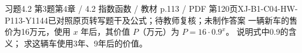 \par\noindent\begin{minipage}{\linewidth}
\begin{bankitem}{习题4.2 第3题}{第4章 / 4.2 指数函数 / 教材 p.113 / PDF 第120页}{XJ-B1-C04-HW-P113-Y1144}{已对照原页转写题干及公式；待教师复核；未制作答案}
一辆新车的售价为16万元，使用 $x$ 年后，其价值 $P$（万元）为 $P=16\cdot0.9^x$。
说明式中0.9的含义；
求这辆车使用3年、9年后的价值。
\end{bankitem}
\end{minipage}\par\medskip
